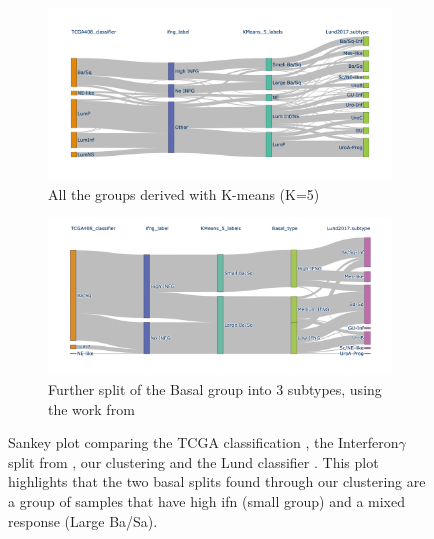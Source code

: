 \begin{figure}[!htb]
    \centering
    \begin{subfigure}[!t]{0.79\textwidth}
    \includegraphics[width=1.0\textwidth,keepaspectratio]{Sections/ClusteringAnalysis/Resources/discussion/inf_comp.png}
        \caption{All the groups derived with K-means (K=5)}
        \label{fig:cs:ifn_all}
    \end{subfigure}
    \centering
    \begin{subfigure}[!t]{0.79\textwidth}
        \includegraphics[width=\textwidth,keepaspectratio]{Sections/ClusteringAnalysis/Resources/discussion/inf_3_basal.png}
        \caption{Further split of the Basal group into 3 subtypes, using the work from \citet{Baker2022-bj}}
        \label{fig:cs:ifn_three_basal}
    \end{subfigure} 
    \centering
    \centering
    \caption{Sankey plot comparing the TCGA classification \citet{Robertson2017-mg}, the Interferon$\gamma$ split from \cite{Baker2022-bj}, our clustering and the Lund classifier \citet{Marzouka2018-ge}. This plot highlights that the two basal splits found through our clustering are a group of samples that have high \acrshort{ifn} (small group) and a mixed response (Large Ba/Sa). }
    \label{fig:cs:ifn_comp}
\end{figure}


